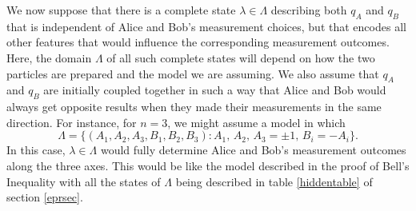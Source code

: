 \documentclass[12pt]{report}
\begin{document}
We now suppose that there is a complete state $\lambda\in\Lambda$ %
%
describing both $q_A$ and $q_B$ that is independent of Alice and Bob's measurement choices, but that encodes all other features that would influence the corresponding measurement outcomes. Here, the domain $\Lambda$ of all such complete states will depend on how the two particles are prepared and the model we are assuming. We also assume that  $q_A$ and $q_B$ are initially coupled together in such a way that Alice and Bob would always get opposite results when they made their measurements in the same direction. For instance, for $n=3$, we might assume a model in which 
\begin{equation}\label{bellLambda}
\Lambda=\big\{(A_1, A_2, A_3 ,B_1, B_2, B_3):A_1,\, A_2,\, A_3=\pm1,\, B_i=-A_i\big\}.
\end{equation}
 In this case, $\lambda\in\Lambda$ would fully determine Alice and Bob's measurement outcomes along the three axes. This would be like the model described in the proof of Bell's Inequality with all the states of $\Lambda$ being described in table \ref{hiddentable} of section \ref{eprsec}. 
\end{document}
